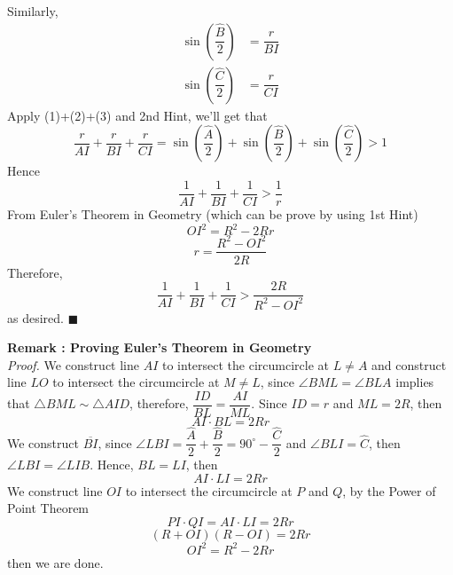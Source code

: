 \documentclass[12pt]{article}
\begin{document}
Similarly,
\begin{align}
\sin{\left(\dfrac{\hat{B}}{2}\right)}&=\dfrac{r}{BI} \\
\sin{\left(\dfrac{\hat{C}}{2}\right)}&=\dfrac{r}{CI}
\end{align}
Apply (1)+(2)+(3) and 2nd Hint, we'll get that
$$\dfrac{r}{AI}+\dfrac{r}{BI}+\dfrac{r}{CI} = \sin{\left(\dfrac{\hat{A}}{2}\right)} + \sin{\left(\dfrac{\hat{B}}{2}\right)} + \sin{\left(\dfrac{\hat{C}}{2}\right)} > 1 $$
Hence 
$$ \dfrac{1}{AI}+\dfrac{1}{BI}+\dfrac{1}{CI}  > \dfrac{1}{r}$$
\newpage
From Euler's Theorem in Geometry (which can be prove by using 1st Hint)
$$ {OI}^2 = R^2-2Rr$$
$$ r = \dfrac{R^2-{OI}^2}{2R}$$
Therefore, $$ \dfrac{1}{AI}+\dfrac{1}{BI}+\dfrac{1}{CI}  > \dfrac{2R}{R^2-{OI}^2}$$
as desired. \null\hfill $\blacksquare$
\begin{boxH}
\textbf{Remark : Proving Euler's Theorem in Geometry} \\
\emph{Proof.} We construct line $AI$ to intersect the circumcircle at $L \neq A$ and construct line $LO$ to intersect the circumcircle at $M \neq L$, since $\angle{BML} = \angle{BLA}$ implies that $\triangle{BML} \sim \triangle{AID}$, therefore, $\dfrac{ID}{BL} = \dfrac{AI}{ML}$. Since $ID =r$ and $ML = 2R$, then $$AI \cdot BL = 2Rr$$
We construct $\overline{BI}$, since $\angle{LBI} = \dfrac{\hat{A}}{2}+\dfrac{\hat{B}}{2} = 90^{\circ} - \dfrac{\hat{C}}{2}$ and $\angle{BLI} = \hat{C}$, then $\angle{LBI} = \angle{LIB}$. Hence, $BL=LI$, then
 $$AI \cdot LI = 2Rr$$
We construct line ${OI}$ to intersect the circumcircle at $P$ and $Q$, by the Power of Point Theorem $$PI \cdot  QI = AI \cdot LI = 2Rr$$
$$(R+OI)(R-OI) = 2Rr$$
$${OI}^2 =R^2-2Rr$$
then we are done.
\end{boxH}
\end{document}
